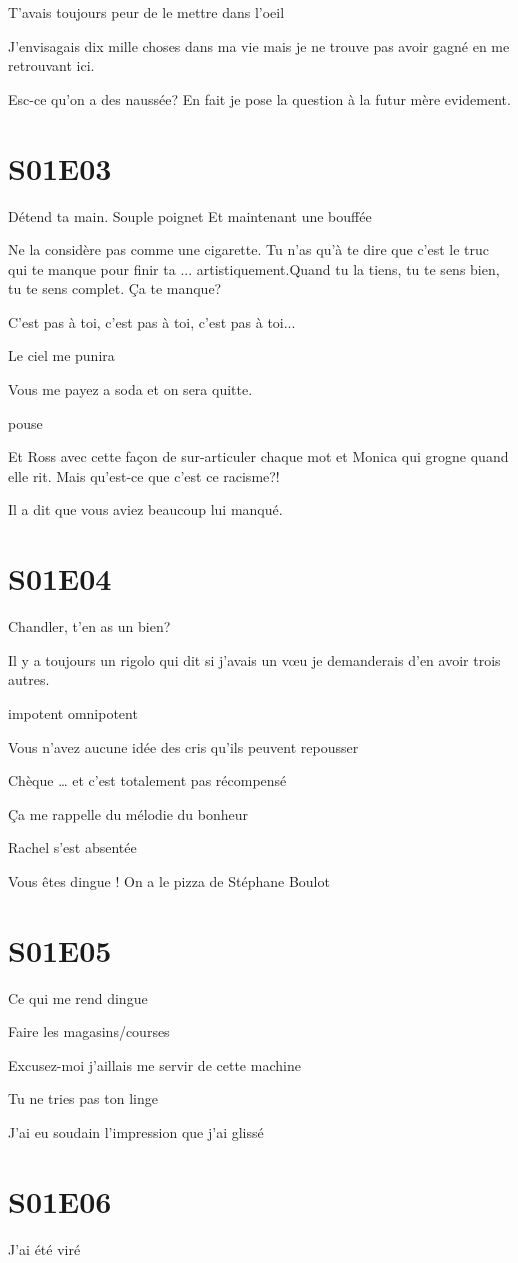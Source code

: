 \documentclass[10pt,a4paper,twoside]{article} %
\begin{document}
T’avais toujours peur de le mettre dans l’oeil

J’envisagais dix mille choses dans ma vie mais je ne trouve pas avoir gagné en me retrouvant ici.

Esc-ce qu’on a des naussée?
En fait je pose la question à la futur mère evidement.

\section{S01E03}
Détend ta main. Souple poignet
Et maintenant une bouffée

Ne la considère pas comme une cigarette. Tu n’as qu’à te dire que c’est le truc qui te manque pour finir ta ... artistiquement.Quand tu la tiens, tu te sens bien, tu te sens complet.
Ça te manque?

C’est pas à toi, c’est pas à toi, c’est pas à toi...

Le ciel me punira

Vous me payez a soda et on sera quitte.

pouse

Et Ross avec cette façon de sur-articuler chaque mot et Monica qui grogne quand elle rit. Mais qu’est-ce que c’est ce racisme?!

Il a dit que vous aviez beaucoup lui manqué.


\section{S01E04}

Chandler, t’en as un bien?

Il y a toujours un rigolo qui dit si j’avais un vœu je demanderais d’en avoir trois autres.

impotent
omnipotent

Vous n’avez aucune idée des cris qu’ils peuvent repousser

Chèque … et c’est totalement pas récompensé

Ça me rappelle du mélodie du bonheur

Rachel s’est absentée

Vous êtes dingue ! On a le pizza de Stéphane Boulot

\section{S01E05}

Ce qui me rend dingue

Faire les magasins/courses

Excusez-moi j’aillais me servir de cette machine

Tu ne tries pas ton linge

J’ai eu soudain l’impression que j’ai glissé

\section{S01E06}

J’ai été viré
\end{document}
